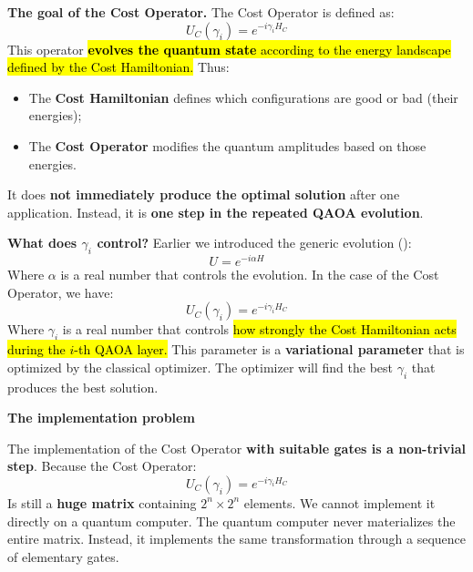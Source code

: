 \highspace
\textcolor{Green3}{ \textbf{The goal of the Cost Operator.}} The Cost Operator is defined as:
\begin{equation*}
    U_C\left(\gamma_i\right) = e^{-i \gamma_i H_C}
\end{equation*}
This operator \hl{\textbf{evolves the quantum state} according to the energy landscape defined by the Cost Hamiltonian.} Thus:
\begin{itemize}
    \item The \textbf{Cost Hamiltonian} defines which configurations are good or bad (their energies);
    \item The \textbf{Cost Operator} modifies the quantum amplitudes based on those energies.
\end{itemize}
It does \textbf{not immediately produce the optimal solution} after one application. Instead, it is \textbf{one step in the repeated QAOA evolution}.

\highspace
\textcolor{Green3}{ \textbf{What does $\gamma_i$ control?}} Earlier we introduced the generic evolution ():
\begin{equation*}
    U = e^{-i \alpha H}
\end{equation*}
Where $\alpha$ is a real number that controls the evolution. In the case of the Cost Operator, we have:
\begin{equation*}
    U_C\left(\gamma_i\right) = e^{-i \gamma_i H_C}
\end{equation*}
Where $\gamma_i$ is a real number that controls \hl{how strongly the Cost Hamiltonian acts during the $i$-th QAOA layer.} This parameter is a \textbf{variational parameter} that is optimized by the classical optimizer. The optimizer will find the best $\gamma_i$ that produces the best solution.

\highspace
\begin{flushleft}
    \textcolor{Red2}{ \textbf{The implementation problem}}
\end{flushleft}
The implementation of the Cost Operator \textbf{with suitable gates is a non-trivial step}. Because the Cost Operator:
\begin{equation*}
    U_C\left(\gamma_i\right) = e^{-i \gamma_i H_C}
\end{equation*}
Is still a \textbf{huge matrix} containing $2^n \times 2^n$ elements. We cannot implement it directly on a quantum computer. The quantum computer never materializes the entire matrix. Instead, it implements the same transformation through a sequence of elementary gates.

